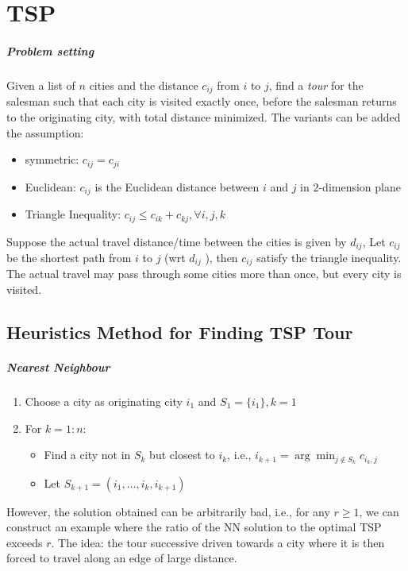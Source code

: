 \chapter{TSP}

\paragraph{Problem setting}
Given a list of $n$ cities and the distance $c_{ij}$ from $i$ to $j$, 
find a \emph{tour} for the salesman such that
each city is visited exactly once, before the salesman returns to the originating city, with
total distance minimized.
The variants can be added the assumption:
\begin{itemize}
\item
symmetric: $c_{ij}=c_{ji}$
\item
Euclidean: $c_{ij}$ is the Euclidean distance between $i$ and $j$ in $2$-dimension plane
\item
Triangle Inequality: $c_{ij}\le c_{ik}+c_{kj},\forall i,j,k$
\end{itemize}
Suppose the actual travel distance/time between the cities is given by $d_{ij}$,
Let $c_{ij}$be the shortest path from $i$ to $j$ (wrt $d_{ij}$ ),
then $c_{ij}$ satisfy the triangle inequality. The actual travel may pass through some cities more than once, but every city is visited.

\section{Heuristics Method for Finding TSP Tour}

\paragraph{Nearest Neighbour}
\begin{enumerate}
\item
Choose a city as originating city $i_1$ and $S_1=\{i_1\},k=1$
\item
For $k=1:n$:
\begin{itemize}
\item
Find a city not in $S_k$ but closest to $i_k$, i.e., $i_{k+1} = \arg\min_{j\notin S_k}c_{i_k, j}$
\item
Let $S_{k+1}=(i_1,\dots,i_k,i_{k+1})$
\end{itemize}
\end{enumerate}
However, the solution obtained can be arbitrarily bad, i.e., for any $r\ge1$, 
we can construct an example where the ratio of the NN solution to the optimal TSP exceeds $r$.
The idea: the tour successive driven towards a city where it is then forced to travel along an edge of large distance.

